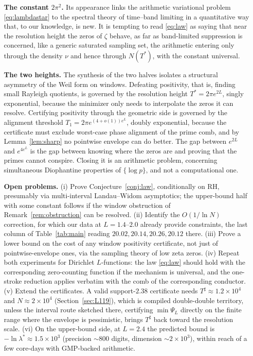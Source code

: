 ﻿\documentclass[11pt]{article}
\newcommand{\lmin}{\lambda^{*}}
\newcommand{\Tstar}{T^{*}}
\newcommand{\Tsharp}{T^{\sharp}}
\begin{document}
\textbf{The constant $2\pi^2$.}  Its appearance links the arithmetic
variational problem \eqref{eq:lambdastar} to the spectral theory of
time--band limiting in a quantitative way that, to our knowledge, is
new.  It is tempting to read \eqref{eq:law} as saying that near the
resolution height the zeros of $\zeta$ behave, as far as band-limited
suppression is concerned, like a generic saturated sampling set, the
arithmetic entering only through the density $\nu$ and hence through
$N(\Tstar)$, with the constant universal.

\textbf{The two heights.}  The synthesis of the two halves isolates a
structural asymmetry of the Weil form on windows.  Defeating positivity,
that is, finding small Rayleigh quotients, is governed by the resolution
height $\Tstar=2\pi e^{2L}$, singly exponential, because the minimizer
only needs to interpolate the zeros it can resolve.  Certifying
positivity through the geometric side is governed by the alignment
threshold $T_1=2\pi e^{(4+o(1))e^{L}}$, doubly exponential, because the
certificate must exclude worst-case phase alignment of the prime comb,
and by Lemma~\ref{lem:sharp} no pointwise envelope can do better.  The
gap between $e^{2L}$ and $e^{4e^L}$ is the gap between knowing where
the zeros are and proving that the primes cannot conspire.  Closing it
is an arithmetic problem, concerning simultaneous Diophantine
properties of $\{\log p\}$, and not a computational one.

\textbf{Open problems.}  (i) Prove Conjecture~\ref{conj:law},
conditionally on RH, presumably via multi-interval Landau--Widom
asymptotics; the upper-bound half with some constant follows if the
window obstruction of Remark~\ref{rem:obstruction} can be resolved.
(ii) Identify the $O(1/\ln N)$ correction, for which our data at
$L=1.4$--$2.0$ already provide constraints, the last column of
Table~\ref{tab:main} reading $20.02,20.14,20.26,20.12$ there.
(iii) Prove a lower bound on the cost of any window positivity
certificate, not just of pointwise-envelope ones, via
the sampling theory of low zeta zeros.  (iv) Repeat both experiments
for Dirichlet $L$-functions: the law \eqref{eq:law} should hold with
the corresponding zero-counting function if the mechanism is
universal, and the one-stroke reduction applies verbatim with the
comb of the corresponding conductor.  (v) Extend the certificates.  A
valid support-$2.38$ certificate needs $\Tsharp\approx1.2\times10^4$
and $N\approx2\times10^4$ (Section~\ref{sec:L119}), which is compiled
double-double territory, unless the interval route sketched there,
certifying $\min\Psi_L$ directly on the finite range where the
envelope is pessimistic, brings $\Tsharp$ back toward the resolution
scale.  (vi) On the upper-bound side, at $L=2.4$ the predicted bound
is $-\ln\lmin\approx1.5\times10^{3}$ (precision $\sim800$ digits,
dimension $\sim2\times10^{3}$), within reach of a few core-days with
GMP-backed arithmetic.
\end{document}
